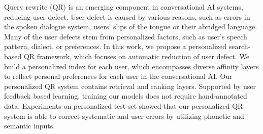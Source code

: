 Query rewrite (QR) is an emerging component in conversational AI systems, reducing user defect. User defect is caused by various reasons, such as errors in the spoken dialogue system, users' slips of the tongue or their abridged language. Many of the user defects stem from personalized factors, such as user's speech pattern, dialect, or preferences. In this work, we propose a personalized search-based QR framework, which focuses on automatic reduction of user defect. We build a personalized index for each user, which encompasses diverse affinity layers to reflect personal preferences for each user in the conversational AI. Our personalized QR system contains retrieval and ranking layers. Supported by user feedback based learning, training our models does not require hand-annotated data. Experiments on personalized test set showed that our personalized QR system is able to correct systematic and user errors by utilizing phonetic and semantic inputs.

